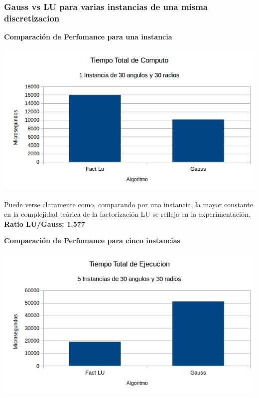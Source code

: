 \subsubsection{Gauss vs LU para varias instancias de una misma discretizacion}


\vspace{0.5cm}

  	\textbf{Comparaci\'on de Perfomance para una instancia}\\
\begin{center}
\includegraphics[scale=0.7]{experimentos2a_2b/2bUnaInstancia.png}
\end{center}

Puede verse claramente como, comparando por una instancia, la mayor constante en la complejidad te\'orica de la factorizaci\'on LU se refleja en la experimentaci\'on. \textbf{Ratio LU/Gauss: 1.577}

 \textbf{Comparaci\'on de Perfomance para cinco instancias}\\
\begin{center}
\includegraphics[scale=0.7]{experimentos2a_2b/2bCincoInstancias.png}
\end{center}

